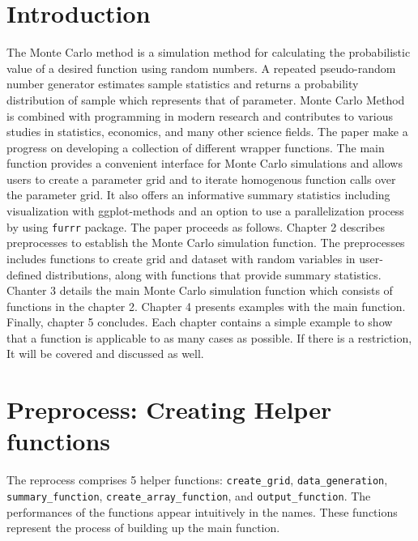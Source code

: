 \documentclass[11pt,a4paper]{article}
\begin{document}
\restoregeometry


{
\hypersetup{linkcolor=black}
\setcounter{tocdepth}{3}
\tableofcontents
}
\newpage
\listoftables
\newpage
\listoffigures
\newpage
{} 
\hypertarget{introduction}{%
\section{Introduction}\label{introduction}}

The Monte Carlo method is a simulation method for calculating the
probabilistic value of a desired function using random numbers. A
repeated pseudo-random number generator estimates sample statistics and
returns a probability distribution of sample which represents that of
parameter\autocite{Barbu_2022}. Monte Carlo Method is combined with
programming in modern research and contributes to various studies in
statistics, economics, and many other science fields. The paper make a
progress on developing a collection of different wrapper functions. The
main function provides a convenient interface for Monte Carlo
simulations and allows users to create a parameter grid and to iterate
homogenous function calls over the parameter grid. It also offers an
informative summary statistics including visualization with
ggplot-methods and an option to use a parallelization process by using
\texttt{furrr} package. The paper proceeds as follows. Chapter 2
describes preprocesses to establish the Monte Carlo simulation function.
The preprocesses includes functions to create grid and dataset with
random variables in user-defined distributions, along with functions
that provide summary statistics. Chanter 3 details the main Monte Carlo
simulation function which consists of functions in the chapter 2.
Chapter 4 presents examples with the main function. Finally, chapter 5
concludes. Each chapter contains a simple example to show that a
function is applicable to as many cases as possible. If there is a
restriction, It will be covered and discussed as well.

\hypertarget{preprocess-creating-helper-functions}{%
\section{Preprocess: Creating Helper
functions}\label{preprocess-creating-helper-functions}}

The reprocess comprises 5 helper functions: \texttt{create\_grid},
\texttt{data\_generation}, \texttt{summary\_function},
\texttt{create\_array\_function}, and \texttt{output\_function}. The
performances of the functions appear intuitively in the names. These
functions represent the process of building up the main function.
\end{document}
